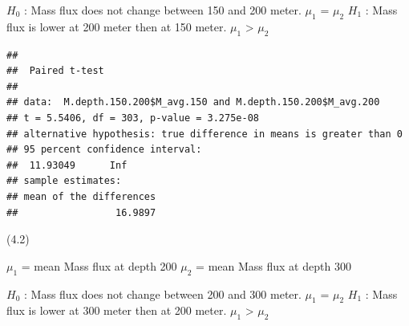 \documentclass[]{article}
\newenvironment{Shaded}{\begin{snugshade}}{\end{snugshade}}
\newcommand{\DataTypeTok}[1]{\textcolor[rgb]{0.13,0.29,0.53}{#1}}
\newcommand{\FloatTok}[1]{\textcolor[rgb]{0.00,0.00,0.81}{#1}}
\newcommand{\KeywordTok}[1]{\textcolor[rgb]{0.13,0.29,0.53}{\textbf{#1}}}
\newcommand{\NormalTok}[1]{#1}
\newcommand{\OperatorTok}[1]{\textcolor[rgb]{0.81,0.36,0.00}{\textbf{#1}}}
\newcommand{\OtherTok}[1]{\textcolor[rgb]{0.56,0.35,0.01}{#1}}
\newcommand{\StringTok}[1]{\textcolor[rgb]{0.31,0.60,0.02}{#1}}
\begin{document}
\(H_0\) : Mass flux does not change between 150 and 200 meter. \(\mu_1\)
= \(\mu_2\) \(H_1\) : Mass flux is lower at 200 meter then at 150 meter.
\(\mu_1\) \textgreater{} \(\mu_2\)

\begin{Shaded}
\end{Shaded}

\begin{verbatim}
## 
##  Paired t-test
## 
## data:  M.depth.150.200$M_avg.150 and M.depth.150.200$M_avg.200
## t = 5.5406, df = 303, p-value = 3.275e-08
## alternative hypothesis: true difference in means is greater than 0
## 95 percent confidence interval:
##  11.93049      Inf
## sample estimates:
## mean of the differences 
##                 16.9897
\end{verbatim}

(4.2)

\(\mu_1\) = mean Mass flux at depth 200 \(\mu_2\) = mean Mass flux at
depth 300

\(H_0\) : Mass flux does not change between 200 and 300 meter. \(\mu_1\)
= \(\mu_2\) \(H_1\) : Mass flux is lower at 300 meter then at 200 meter.
\(\mu_1\) \textgreater{} \(\mu_2\)

\begin{Shaded}
\end{Shaded}
\end{document}
